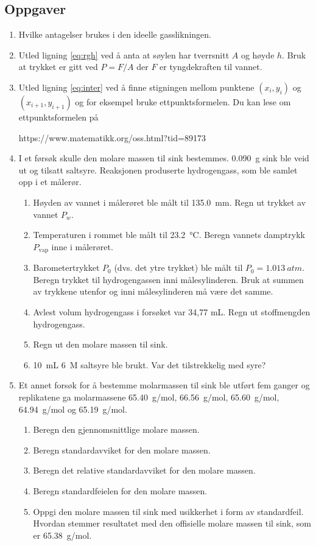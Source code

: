 	\subsection{Oppgaver}
	\begin{enumerate}
		\item Hvilke antagelser brukes i den ideelle gasslikningen.
		\item Utled ligning \eqref{eq:rgh} ved å anta at søylen har tverrsnitt $A$ og høyde $h$. Bruk at trykket er gitt ved $P=F/A$ der $F$ er tyngdekraften til vannet.	
		\item Utled ligning  \eqref{eq:inter} ved å finne stigningen mellom punktene $(x_i, y_i)$ og $(x_{i+1}, y_{i+1})$ og for eksempel bruke ettpunktsformelen. Du kan lese om ettpunktsformelen på
		
		https://www.matematikk.org/oss.html?tid=89173
		\item I et førsøk skulle den molare massen til sink bestemmes. \SI{0.090}{g} sink ble veid ut og tilsatt saltsyre. Reaksjonen produserte hydrogengass, som ble samlet opp i et målerør.
		\begin{enumerate}
			\item Høyden av vannet i målerøret ble målt til \SI{135.0}{mm}. Regn ut trykket av vannet $P_w$.
			\item Temperaturen i rommet ble målt til \SI{23.2}{\degreeCelsius}. Beregn vannets damptrykk $P_\mathrm{vap}$ inne i målerøret.
			\item Barometertrykket $P_0$ (dvs. det ytre trykket) ble målt til $P_0=\SI{1.013}{atm}$. Beregn trykket til hydrogengassen inni målesylinderen. Bruk at summen av trykkene utenfor og inni målesylinderen må være det samme.
			\item Avlest volum hydrogengass i forsøket var 34,77 mL. Regn ut stoffmengden hydrogengass.
			\item Regn ut den molare massen til sink.
			\item \SI{10}{mL} \SI{6}{M} saltsyre ble brukt. Var det tilstrekkelig med syre?
		\end{enumerate}
		\item Et annet forsøk for å bestemme molarmassen til sink ble utført fem ganger og replikatene ga molarmassene \SI{65,40}{g/mol}, \SI{66,56}{g/mol}, \SI{65,60}{g/mol}, \SI{64,94}{g/mol} og \SI{65,19}{g/mol}.
		\begin{enumerate}
			\item Beregn den gjennomsnittlige molare massen.
			\item Beregn standardavviket for den molare massen.
			\item Beregn det relative standardavviket for den molare massen.
			\item Beregn standardfeielen for den molare massen.
			\item Oppgi den molare massen til sink med usikkerhet i form av standardfeil. Hvordan stemmer resultatet med den offisielle molare massen til sink, som er \SI{65.38}{g/mol}.
		\end{enumerate}
	\end{enumerate}
	
